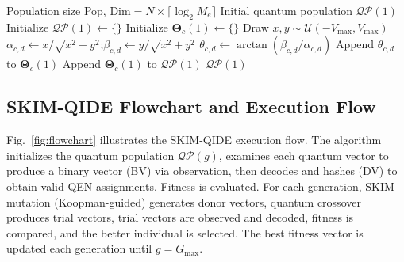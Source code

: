 \documentclass[10pt,twocolumn]{article}
\begin{document}
\begin{algorithm}[t]
\caption{Quantum Population Initialization}
\label{alg:pop}
\small
\begin{algorithmic}[1]
\REQUIRE Population size Pop, $\mathrm{Dim}=N\times\lceil\log_2 M_e\rceil$
\ENSURE Initial quantum population $\mathcal{QP}(1)$
\STATE Initialize $\mathcal{QP}(1)\leftarrow\{\}$
    \STATE Initialize $\boldsymbol{\Theta}_c(1)\leftarrow\{\}$
        \STATE Draw $x,y\sim\mathcal{U}(-V_{\max},V_{\max})$
        \STATE $\alpha_{c,d}\leftarrow x/\sqrt{x^2+y^2}$;\quad $\beta_{c,d}\leftarrow y/\sqrt{x^2+y^2}$
        \STATE $\theta_{c,d}\leftarrow\arctan(\beta_{c,d}/\alpha_{c,d})$
        \STATE Append $\theta_{c,d}$ to $\boldsymbol{\Theta}_c(1)$
    \ENDFOR
    \STATE Append $\boldsymbol{\Theta}_c(1)$ to $\mathcal{QP}(1)$
\ENDFOR
\RETURN $\mathcal{QP}(1)$
\end{algorithmic}
\end{algorithm}

\subsection{SKIM-QIDE Flowchart and Execution Flow}

Fig.~\ref{fig:flowchart} illustrates the SKIM-QIDE execution flow. The algorithm initializes the quantum population $\mathcal{QP}(g)$, examines each quantum vector to produce a binary vector (BV) via observation, then decodes and hashes (DV) to obtain valid QEN assignments. Fitness is evaluated. For each generation, SKIM mutation (Koopman-guided) generates donor vectors, quantum crossover produces trial vectors, trial vectors are observed and decoded, fitness is compared, and the better individual is selected. The best fitness vector is updated each generation until $g=G_{\max}$.
\end{document}

